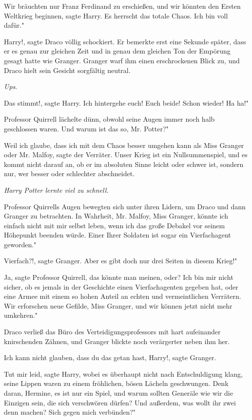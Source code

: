 \glqq Wir bräuchten nur Franz Ferdinand zu erschießen, und wir könnten den
Ersten Weltkrieg beginnen\grqq{}, sagte Harry. \glqq Es herrscht das totale
Chaos. Ich bin voll dafür."

\glqq Harry!\grqq{}, sagte Draco völlig schockiert. Er bemerkte erst eine
Sekunde später, dass er es genau zur gleichen Zeit und in genau dem gleichen Ton
der Empörung gesagt hatte wie Granger. Granger warf ihm einen erschrockenen
Blick zu, und Draco hielt sein Gesicht sorgfältig neutral.

\emph{Ups}.

\glqq Das stimmt!\grqq{}, sagte Harry. \glqq Ich hintergehe euch! Euch beide!
Schon wieder! Ha ha!"

Professor Quirrell lächelte dünn, obwohl seine Augen immer noch halb geschlossen
waren. \glqq Und warum ist das so, Mr. Potter?"

\glqq Weil ich glaube, dass ich mit dem Chaos besser umgehen kann als Miss
Granger oder Mr. Malfoy\grqq{}, sagte der Verräter. \glqq Unser Krieg ist ein
Nullsummenspiel, und es kommt nicht darauf an, ob er im absoluten Sinne leicht
oder schwer ist, sondern nur, wer besser oder schlechter abschneidet.\grqq{}

\emph{Harry Potter lernte viel zu schnell.}

Professor Quirrells Augen bewegten sich unter ihren Lidern, um Draco und dann
Granger zu betrachten. \glqq In Wahrheit, Mr. Malfoy, Miss Granger, könnte ich
einfach nicht mit mir selbst leben, wenn ich das große Debakel vor seinem
Höhepunkt beenden würde. Einer Ihrer Soldaten ist sogar ein Vierfachagent
geworden."

\glqq Vierfach?!\grqq{}, sagte Granger. \glqq Aber es gibt doch nur drei Seiten
in diesem Krieg!"

\glqq Ja\grqq{}, sagte Professor Quirrell, \glqq das könnte man meinen, oder?
Ich bin mir nicht sicher, ob es jemals in der Geschichte einen Vierfachagenten
gegeben hat, oder eine Armee mit einem so hohen Anteil an echten und
vermeintlichen Verrätern. Wir erforschen neue Gefilde, Miss Granger, und wir
können jetzt nicht mehr umkehren."

Draco verließ das Büro des Verteidigungsprofessors mit hart aufeinander
knirschenden Zähnen, und Granger blickte noch verärgerter neben ihm her.

\glqq Ich kann nicht glauben, dass du das getan hast, Harry!\grqq{}, sagte
Granger.

\glqq Tut mir leid\grqq{}, sagte Harry, wobei es überhaupt nicht nach
Entschuldigung klang, seine Lippen waren zu einem fröhlichen, bösen Lächeln
geschwungen. \glqq Denk daran, Hermine, es ist nur ein Spiel, und warum sollten
Generäle wie wir die Einzigen sein, die sich verschwören dürfen? Und außerdem,
was wollt ihr zwei denn machen? Sich gegen mich verbünden?"

